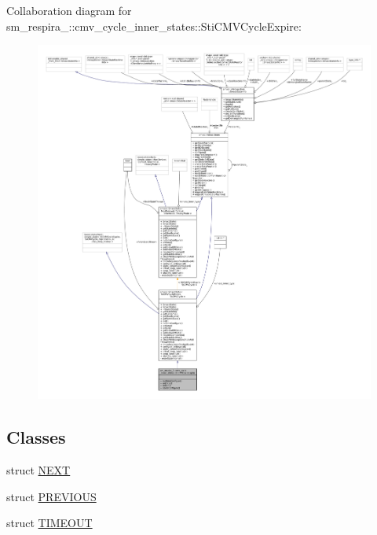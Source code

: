 Collaboration diagram for sm\+\_\+respira\+\_\+:\+:cmv\+\_\+cycle\+\_\+inner\+\_\+states\+:\+:Sti\+C\+M\+V\+Cycle\+Expire\+:
\nopagebreak
\begin{figure}[H]
\begin{center}
\leavevmode
\includegraphics[width=350pt]{structsm__respira__1_1_1cmv__cycle__inner__states_1_1StiCMVCycleExpire__coll__graph}
\end{center}
\end{figure}
\subsection*{Classes}
\begin{DoxyCompactItemize}
\item 
struct \hyperlink{structsm__respira__1_1_1cmv__cycle__inner__states_1_1StiCMVCycleExpire_1_1NEXT}{N\+E\+XT}
\item 
struct \hyperlink{structsm__respira__1_1_1cmv__cycle__inner__states_1_1StiCMVCycleExpire_1_1PREVIOUS}{P\+R\+E\+V\+I\+O\+US}
\item 
struct \hyperlink{structsm__respira__1_1_1cmv__cycle__inner__states_1_1StiCMVCycleExpire_1_1TIMEOUT}{T\+I\+M\+E\+O\+UT}
\end{DoxyCompactItemize}
